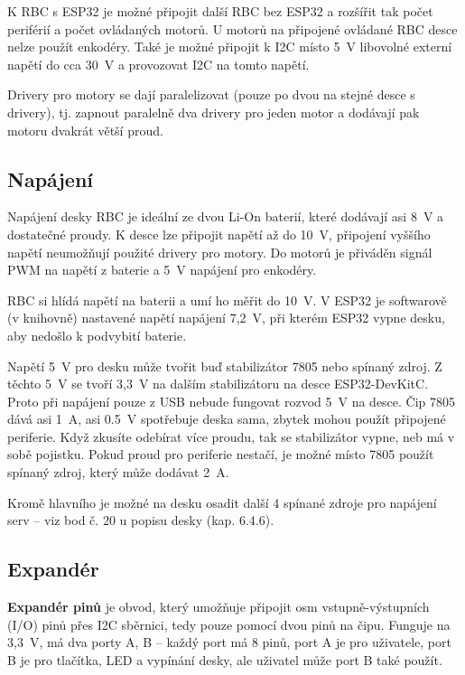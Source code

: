 K RBC s ESP32 je možné připojit další RBC bez ESP32 a rozšířit tak počet periférií a počet ovládaných motorů. 
U motorů na připojené ovládané RBC desce nelze použít enkodéry. 
Také je možné připojit k I2C místo 5~V libovolné externí napětí do cca 30~V  a provozovat I2C na tomto napětí. 

Drivery pro motory se dají paralelizovat (pouze po dvou na stejné desce s drivery), tj. zapnout
paralelně dva drivery pro jeden motor a dodávají pak motoru dvakrát větší proud.

\subsection{Napájení}

Napájení desky RBC je ideální ze dvou Li-On baterií, %
 které dodávají asi 8~V a dostatečné proudy. 
 K desce lze připojit napětí až do 10~V, připojení vyššího napětí neumožňují použité drivery pro motory. %
 Do motorů je přiváděn signál PWM na napětí z baterie a 5~V napájení pro enkodéry.  

RBC si hlídá napětí na baterii a umí ho měřit do 10~V. 
V ESP32 je softwarově (v knihovně) nastavené napětí napájení 7,2~V, při kterém ESP32 vypne desku, aby nedošlo k podvybití baterie.     

Napětí 5~V pro desku může tvořit buď stabilizátor 7805 nebo spínaný zdroj.
Z těchto 5~V se tvoří 3,3~V na dalším stabilizátoru na desce ESP32-DevKitC.
Proto při napájení pouze z USB nebude fungovat rozvod 5~V na desce. Čip
7805 dává asi 1~A, asi 0.5~V spotřebuje deska sama, zbytek mohou použít
připojené periferie. Když zkusíte odebírat více proudu, tak se stabilizátor
vypne, neb má v sobě pojistku. Pokud proud pro periferie nestačí, je možné
místo 7805 použít spínaný zdroj, který může dodávat 2~A.

Kromě hlavního je možné na desku osadit další 4 spínané zdroje pro napájení
serv – viz bod č. 20 u popisu desky (kap. 6.4.6).


\subsection{Expandér}

\textbf{Expandér pinů} \label{expander}   je obvod, který umožňuje připojit osm vstupně-výstupních (I/O) pinů přes I2C sběrnici, tedy pouze pomocí dvou pinů na čipu. 
Funguje na 3,3~V, má dva porty A, B -- každý port má 8 pinů, port A je pro uživatele, port B je pro tlačítka, LED a vypínání desky, ale uživatel může port B také použít.

